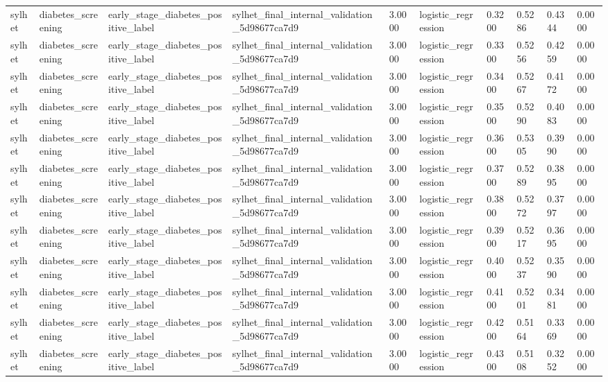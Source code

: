 \begin{tabular}{llllllllll}
sylhet & diabetes\_screening & early\_stage\_diabetes\_positive\_label & sylhet\_final\_internal\_validation\_5d98677ca7d9 & 3.0000 & logistic\_regression & 0.3200 & 0.5286 & 0.4344 & 0.0000 \\
sylhet & diabetes\_screening & early\_stage\_diabetes\_positive\_label & sylhet\_final\_internal\_validation\_5d98677ca7d9 & 3.0000 & logistic\_regression & 0.3300 & 0.5256 & 0.4259 & 0.0000 \\
sylhet & diabetes\_screening & early\_stage\_diabetes\_positive\_label & sylhet\_final\_internal\_validation\_5d98677ca7d9 & 3.0000 & logistic\_regression & 0.3400 & 0.5267 & 0.4172 & 0.0000 \\
sylhet & diabetes\_screening & early\_stage\_diabetes\_positive\_label & sylhet\_final\_internal\_validation\_5d98677ca7d9 & 3.0000 & logistic\_regression & 0.3500 & 0.5290 & 0.4083 & 0.0000 \\
sylhet & diabetes\_screening & early\_stage\_diabetes\_positive\_label & sylhet\_final\_internal\_validation\_5d98677ca7d9 & 3.0000 & logistic\_regression & 0.3600 & 0.5305 & 0.3990 & 0.0000 \\
sylhet & diabetes\_screening & early\_stage\_diabetes\_positive\_label & sylhet\_final\_internal\_validation\_5d98677ca7d9 & 3.0000 & logistic\_regression & 0.3700 & 0.5289 & 0.3895 & 0.0000 \\
sylhet & diabetes\_screening & early\_stage\_diabetes\_positive\_label & sylhet\_final\_internal\_validation\_5d98677ca7d9 & 3.0000 & logistic\_regression & 0.3800 & 0.5272 & 0.3797 & 0.0000 \\
sylhet & diabetes\_screening & early\_stage\_diabetes\_positive\_label & sylhet\_final\_internal\_validation\_5d98677ca7d9 & 3.0000 & logistic\_regression & 0.3900 & 0.5217 & 0.3695 & 0.0000 \\
sylhet & diabetes\_screening & early\_stage\_diabetes\_positive\_label & sylhet\_final\_internal\_validation\_5d98677ca7d9 & 3.0000 & logistic\_regression & 0.4000 & 0.5237 & 0.3590 & 0.0000 \\
sylhet & diabetes\_screening & early\_stage\_diabetes\_positive\_label & sylhet\_final\_internal\_validation\_5d98677ca7d9 & 3.0000 & logistic\_regression & 0.4100 & 0.5201 & 0.3481 & 0.0000 \\
sylhet & diabetes\_screening & early\_stage\_diabetes\_positive\_label & sylhet\_final\_internal\_validation\_5d98677ca7d9 & 3.0000 & logistic\_regression & 0.4200 & 0.5164 & 0.3369 & 0.0000 \\
sylhet & diabetes\_screening & early\_stage\_diabetes\_positive\_label & sylhet\_final\_internal\_validation\_5d98677ca7d9 & 3.0000 & logistic\_regression & 0.4300 & 0.5108 & 0.3252 & 0.0000 \\

\end{tabular}

